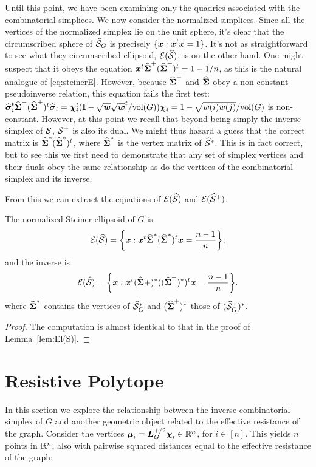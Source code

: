 Until this point, we have been examining only the quadrics associated with the combinatorial simplices. We now consider the normalized simplices. Since all the vertices of the normalized simplex lie on the unit sphere, it's clear  that the circumscribed sphere of $\widehat{\mathcal{S}}_G$ is precisely $\{\vb*{x}:\vb*{x}^t\vb*{x}=1\}$. It's not as straightforward  to see what they circumscribed ellipsoid, $\mathcal{E}(\widehat{\mathcal{S}})$, is on the other hand. One might suspect that it obeys the  equation $\vb*{x}^t \widehat{\boldsymbol{\Sigma}}^+(\widehat{\boldsymbol{\Sigma}}^+)^t=1-1/n$, as this is the natural analogue of \eqref{eq:steinerE}. However, because $\widehat{\boldsymbol{\Sigma}}^+$ and $\widehat{\boldsymbol{\Sigma}}$ obey a non-constant pseudoinverse relation, this equation fails the first test: $\widehat{\vb*{\sigma}}_i^t\widehat{\boldsymbol{\Sigma}}^+(\widehat{\boldsymbol{\Sigma}}^+)^t\widehat{\vb*{\sigma}}_i = \boldsymbol{\chi}_i^t(\vb{I}-\sqrt{\vb*{w}}\sqrt{\vb*{w}}^t/\textnormal{vol}(G))\boldsymbol{\chi}_i=1-\sqrt{w(i)w(j)}/\textnormal{vol}(G)$ is non-constant. 
However, at this point we recall that beyond being simply  the inverse simplex of $\mathcal{S}$, $\mathcal{S}^+$ is also its dual.  We might thus hazard a guess that the correct matrix is $\widehat{\boldsymbol{\Sigma}}^* (\widehat{\boldsymbol{\Sigma}}^*)^t$, where $\widehat{\boldsymbol{\Sigma}}^*$ is the vertex matrix of $\widehat{\mathcal{S}}^*$. This is in fact correct, but to see this we first need to demonstrate that any set of simplex vertices and their  duals obey the same relationship as do the vertices of the combinatorial simplex and its inverse. 



From this we can extract the equations of $\mathcal{E}(\widehat{\mathcal{S}})$ and $\mathcal{E}(\widehat{\mathcal{S}}^+)$. 

\begin{corollary}
	\label{cor:El(Sn)}
	The normalized Steiner ellipsoid of $G$ is 
	\begin{equation*}
	\mathcal{E}(\widehat{\mathcal{S}}) = \bigg\{\vb*{x}:\vb*{x}^t \widehat{\boldsymbol{\Sigma}}^*(\widehat{\boldsymbol{\Sigma}}^*)^t\vb*{x} = \frac{n-1}{n}\bigg\},
	\end{equation*}
	and the inverse is 
	\begin{equation*}
		\mathcal{E}(\widehat{\mathcal{S}}) = \bigg\{\vb*{x}:\vb*{x}^t (\widehat{\boldsymbol{\Sigma}}+)^*((\widehat{\boldsymbol{\Sigma}}^+)^*)^t\vb*{x} = \frac{n-1}{n}\bigg\}.
	\end{equation*}
	where $\widehat{\boldsymbol{\Sigma}}^*$ contains the vertices of $\widehat{\mathcal{S}}_G^*$ and $(\widehat{\boldsymbol{\Sigma}}^+)^*$ those of $(\widehat{\mathcal{S}}_G^+)^*$. 
\end{corollary}
\begin{proof}
	The computation is almost identical to that in the proof of Lemma~\ref{lem:El(S)}.
\end{proof}



\section{Resistive Polytope}
\label{sec:resistive_polytope}
In this section we explore the relationship between the inverse combinatorial simplex of $G$ and another geometric object related to the effective resistance of the graph. Consider the vertices $\vb*{\mu}_i=\vb*{L}_G^{+/2}\boldsymbol{\chi}_i\in\mathbb{R}^n$, for $i\in[n]$. This yields $n$ points in $\mathbb{R}^n$, also with pairwise squared distances equal to the effective resistance of the graph: 

